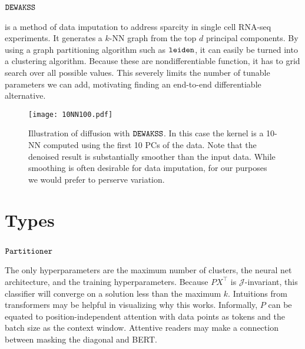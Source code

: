 \subsection{$\mathop{\mathtt{DEWAKSS}}\limits$}
\label{app:DEWAKSS}
\DEWAKSS\cite{tjarnberg2021} is a method of data imputation to address sparcity in single cell RNA-seq experiments.
It generates a $k$-NN graph from the top $d$ principal components.
By using a graph partitioning algorithm such as $\mathop{\mathtt{leiden}}\limits$\cite{DBLP:journals/corr/abs-1810-08473},
it can easily be turned into a clustering algorithm.
Because these are nondifferentiable function, it has to grid search over all possible values.
This severely limits the number of tunable parameters we can add, motivating finding an end-to-end differentiable alternative.

\begin{figure}
  \texttt{[image: 10NN100.pdf]}
  \caption{Illustration of diffusion with $\mathop{\mathtt{DEWAKSS}}\limits$. In this case the kernel is a 10-NN computed using the first 10 PCs of the data. Note that the denoised result is substantially smoother than the input data. While smoothing is often desirable for data imputation, for our purposes we would prefer to perserve variation.}
  \label{fig:diffusion}
\end{figure}





\section{Types}

\subsection{$\mathop{\mathtt{Partitioner}}\limits$}
\label{app:Partitioner}

The only hyperparameters are the maximum number of clusters, the neural net architecture, and the training hyperparameters.
Because $PX^\top$ is $\mathcal{J}$-invariant, this classifier will converge on a solution less than the maximum $k$.
Intuitions from transformers may be helpful in visualizing why this works.
Informally, $P$ can be equated to position-independent attention with data points as tokens and the batch size as the context window.
Attentive readers may make a connection between masking the diagonal and BERT.




